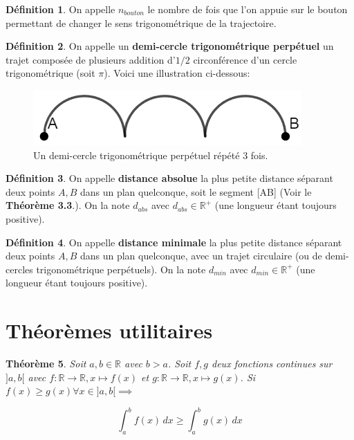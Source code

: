 \documentclass{amsart}
\newtheorem{theorem}{Théorème}[section]
\theoremstyle{definition}
\newtheorem{definition}[theorem]{Définition}
\theoremstyle{remark}
\numberwithin{equation}{section}
\begin{document}
\begin{definition}
  On appelle $n_{bouton}$ le nombre de fois que l'on appuie sur le bouton permettant de changer le sens trigonométrique de la trajectoire.
\end{definition}

\begin{definition}
  On appelle un \textbf{demi-cercle trigonométrique perpétuel} un trajet composée de plusieurs addition d'$1/2$ circonférence d'un cercle trigonométrique (soit $\pi$). Voici une illustration ci-dessous:
  
  \begin{figure}[H]
    \centering
    \includegraphics[scale=0.5]{demicircle.png}
    \caption{Un demi-cercle trigonométrique perpétuel répété 3 fois.}
  \end{figure}
\end{definition}

\begin{definition}
  On appelle \textbf{distance absolue} la plus petite distance séparant deux points $A,B$ dans un plan quelconque, soit le segment [AB] (Voir le \textbf{Théorème 3.3}.). On la note $d_{abs}$ avec $d_{abs}\in\mathbb{R^+}$ (une longueur étant toujours positive).
\end{definition}

\begin{definition}
  On appelle \textbf{distance minimale} la plus petite distance séparant deux points $A,B$ dans un plan quelconque, avec un trajet circulaire (ou de demi-cercles trigonométrique perpétuels). On la note $d_{min}$ avec $d_{min}\in\mathbb{R^+}$ (une longueur étant toujours positive).
\end{definition}

\section{Théorèmes utilitaires}

\begin{theorem}
  Soit $a,b\in\mathbb{R}$ avec $b>a$. Soit $f,g$ deux fonctions continues sur $]a,b[$ avec $f:\mathbb{R}\longrightarrow \mathbb{R}, x\longmapsto f(x)$ et $g:\mathbb{R}\longrightarrow \mathbb{R}, x\longmapsto g(x)$. Si $f(x)\geq g(x) \forall x\in]a,b[\implies$

  \[\int_{a}^{b}f(x) \,dx \geq \int_{a}^{b}g(x) \,dx\]
\end{theorem}
\end{document}

